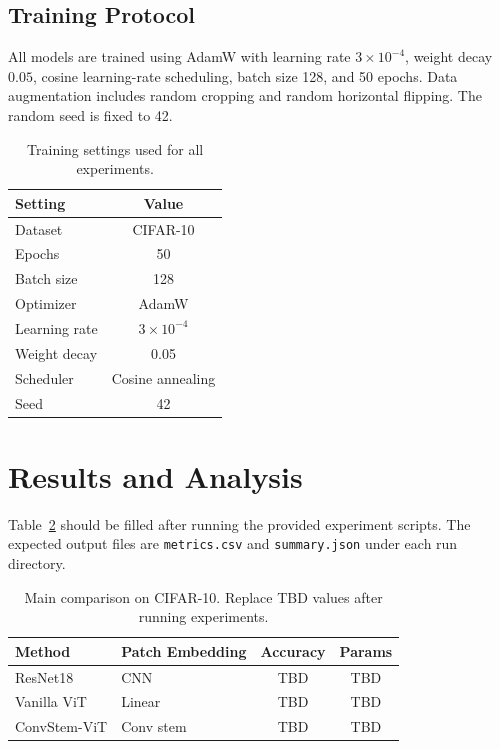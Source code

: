 \documentclass[letterpaper]{article}
\begin{document}
\subsection{Training Protocol}

All models are trained using AdamW with learning rate $3 \times 10^{-4}$,
weight decay $0.05$, cosine learning-rate scheduling, batch size 128, and 50
epochs. Data augmentation includes random cropping and random horizontal
flipping. The random seed is fixed to 42.

\begin{table}[t]
\centering
\caption{Training settings used for all experiments.}
\begin{tabular}{lc}
\toprule
Setting & Value \\
\midrule
Dataset & CIFAR-10 \\
Epochs & 50 \\
Batch size & 128 \\
Optimizer & AdamW \\
Learning rate & $3 \times 10^{-4}$ \\
Weight decay & 0.05 \\
Scheduler & Cosine annealing \\
Seed & 42 \\
\bottomrule
\end{tabular}
\label{tab:settings}
\end{table}

\section{Results and Analysis}

Table~\ref{tab:results} should be filled after running the provided experiment
scripts. The expected output files are \texttt{metrics.csv} and
\texttt{summary.json} under each run directory.

\begin{table}[t]
\centering
\caption{Main comparison on CIFAR-10. Replace TBD values after running experiments.}
\begin{tabular}{llcc}
\toprule
Method & Patch Embedding & Accuracy & Params \\
\midrule
ResNet18 & CNN & TBD & TBD \\
Vanilla ViT & Linear & TBD & TBD \\
ConvStem-ViT & Conv stem & TBD & TBD \\
\bottomrule
\end{tabular}
\label{tab:results}
\end{table}
\end{document}
